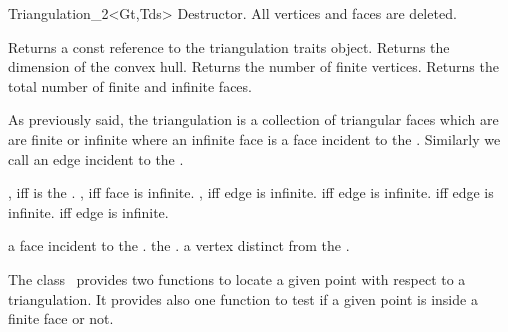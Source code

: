 \begin{ccClassTemplate}{Triangulation_2<Gt,Tds>}
{Destructor. All vertices and faces are deleted.}


\ccAccessFunctions
{}
{Returns a const reference to the triangulation traits object.}
\ccGlue
{}
{Returns the dimension of the convex hull.}
\ccGlue
{}
{Returns the number of finite vertices.}
\ccGlue
{}
{Returns the total number of finite and infinite faces.}



As previously said, the triangulation is a collection of
triangular faces which are  are finite or infinite
where an infinite face is a face incident  to the
.
Similarly we call 
an edge incident to the .

{, iff  is the .}
\ccGlue
{}
{, iff face  is infinite.}
\ccGlue
{}
{, iff edge  is infinite.}
\ccGlue
{}
{ iff edge  is infinite.}
\ccGlue
{}
{ iff edge  is infinite.}
\ccGlue
{}
{ iff edge  is infinite.}

{a  face incident to the .}
\ccGlue
{}
{the .}
\ccGlue
{}
{a vertex distinct from  the .}


The class \ccClassTemplateName\  provides two functions to locate
a given point with respect to a triangulation. It provides
also one function to test if a given point is inside a finite face
or not.


\end{ccClassTemplate}
